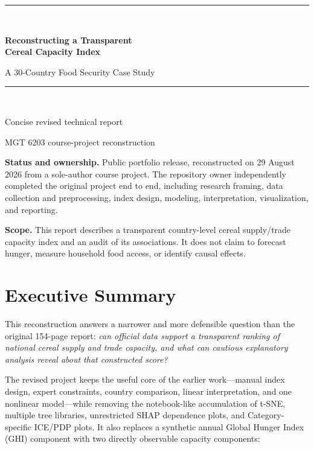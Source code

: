 \documentclass[11pt]{article}
\begin{document}
\begin{titlepage}
\thispagestyle{empty}
\vspace*{0.85in}
{\color{navy}\rule{\textwidth}{1.5pt}}\\[0.35in]
{\Huge\bfseries Reconstructing a Transparent\\[0.10in]
Cereal Capacity Index\par}
\vspace{0.18in}
{\LARGE A 30-Country Food Security Case Study\par}
\vspace{0.32in}
{\color{navy}\rule{\textwidth}{0.7pt}}\\[0.45in]

{\large Concise revised technical report\par}
\vspace{0.18in}
{\large MGT 6203 course-project reconstruction\par}

\vfill
\begin{minipage}{0.92\textwidth}
\small
\textbf{Status and ownership.} Public portfolio release, reconstructed on 29 August 2026 from a sole-author course project. The repository owner independently completed the original project end to end, including research framing, data collection and preprocessing, index design, modeling, interpretation, visualization, and reporting.

\textbf{Scope.} This report describes a transparent country-level cereal supply/trade capacity index and an audit of its associations. It does not claim to forecast hunger, measure household food access, or identify causal effects.
\end{minipage}
\vspace{0.35in}
\end{titlepage}


\section*{Executive Summary}

This reconstruction answers a narrower and more defensible question than the original 154-page report: \emph{can official data support a transparent ranking of national cereal supply and trade capacity, and what can cautious explanatory analysis reveal about that constructed score?}

The revised project keeps the useful core of the earlier work---manual index design, expert constraints, country comparison, linear interpretation, and one nonlinear model---while removing the notebook-like accumulation of t-SNE, multiple tree libraries, unrestricted SHAP dependence plots, and Category-specific ICE/PDP plots. It also replaces a synthetic annual Global Hunger Index (GHI) component with two directly observable capacity components:
\end{document}
